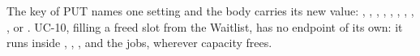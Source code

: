 {\sloppy The key of PUT  names one setting and the body carries its new value: , , , , , , , , , or . UC-10, filling a freed slot from the Waitlist, has no endpoint of its own: it runs inside , , , and the jobs, wherever capacity frees.\par}
